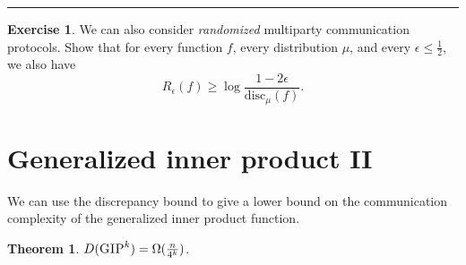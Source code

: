 \documentclass[11pt,oneside]{book}
\theoremstyle{plain}
\newtheorem{theorem}{Theorem}
\theoremstyle{definition}
\newtheorem{exercise}{Exercise}
\theoremstyle{plain}
\newcommand{\disc}{\mathrm{disc}}
\newcommand{\GIP}{\textsc{GIP}}
\newcommand{\exercises}{\bigskip \noindent\rule{8cm}{0.4pt} \medskip}
\begin{document}
	\exercises
	
	\begin{exercise}
		We can also consider \emph{randomized} multiparty communication protocols. Show that for every function $f$, every distribution $\mu$, and every $\epsilon \le \frac12$, we also have
		\[
		R_\epsilon(f) \ge \log \frac{1-2\epsilon}{\disc_\mu(f)}.
		\]
	\end{exercise}
	
	
	 
	\section{Generalized inner product II}
	
	We can use the discrepancy bound to give a lower bound on the communication complexity of the generalized inner product function.
	
	\begin{theorem}
		$D(\GIP^k) = \Omega(\frac{n}{4^k})$.
	\end{theorem}
	
\end{document}
